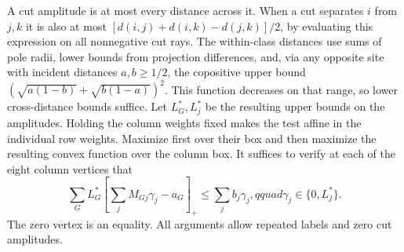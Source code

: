 \documentclass[11pt,a4paper]{article}
\theoremstyle{definition}
\begin{document}
A cut amplitude is at most every distance across it. When a cut
separates $i$ from $j,k$ it is also at most
$[d(i,j)+d(i,k)-d(j,k)]/2$, by evaluating this expression on all
nonnegative cut rays. The within-class distances use sums of pole
radii, lower bounds from projection differences, and, via any opposite
site with incident distances $a,b\ge1/2$, the copositive upper bound
$(\sqrt{a(1-b)}+\sqrt{b(1-a)})^2$. This function decreases on that
range, so lower cross-distance bounds suffice.
Let $L_G^*,L_j^*$ be the resulting upper bounds on the amplitudes.
Holding the column weights fixed makes the test affine in the individual
row weights. Maximize first over their box and then maximize the
resulting convex function over the column box. It suffices to verify
at each of the eight column vertices that
\begin{equation}\label{eq:seven-cut-test}
 \sum_G L_G^*\left[\sum_jM_{Gj}\gamma_j-a_G\right]_+
              \le\sum_j b_j\gamma_j,qquad \gamma_j\in\{0,L_j^*\}.
\end{equation}
The zero vertex is an equality. All arguments allow repeated labels and
zero cut amplitudes.
\end{document}
